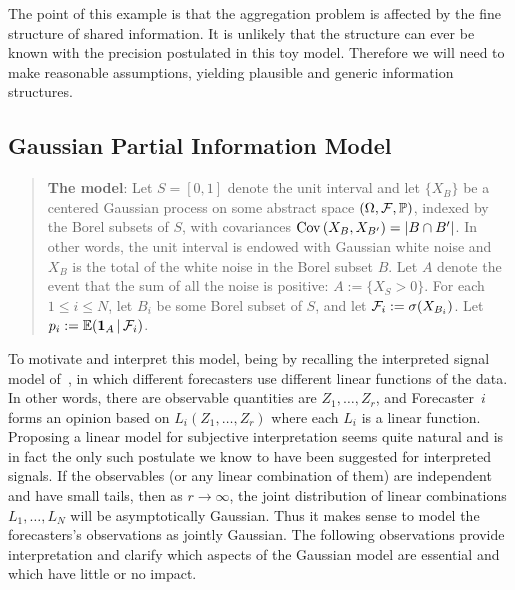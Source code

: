 \documentclass[11pt]{article}
\renewcommand{\P}{\mathbb{P}}
\newcommand{\E}{\mathbb{E}}
\theoremstyle{definition}
\theoremstyle{definition}
\def\one{{\bf 1}}
\def\F{{\cal F}}
\def\P{{\mathbb P}}
\def\E{{\mathbb E}}
\def\Cov{{\rm Cov}\,}
\def\|{\, | \,}
\begin{document}
The point of this example is that the aggregation problem is 
affected by the fine structure of shared information.  It is
unlikely that the structure can ever be known with the precision
postulated in this toy model.  Therefore we will need to make
reasonable assumptions, yielding plausible and generic information
structures.

\subsection{Gaussian Partial Information Model}
\label{ss:Gaussian}

\begin{quote}
{\bf The model}: Let $S = [0,1]$ denote 
the unit interval and let $\{ X_B \}$ be a centered Gaussian process 
on some abstract space $(\Omega , \F , \P)$, indexed by the 
Borel subsets of $S$, with covariances $\Cov (X_B , X_{B'}) 
= |B \cap B'|$.  In other words, the unit interval is endowed
with Gaussian white noise and $X_B$ is the total of the white
noise in the Borel subset $B$.  Let $A$ denote the event that
the sum of all the noise is positive: $A := \{ X_S > 0 \}$.
For each $1 \leq i \leq N$, let $B_i$ be some Borel subset of $S$,
and let $\F_i := \sigma (X_{B_i})$.  Let $p_i := \E (\one_A \| \F_i)$.
\end{quote}

To motivate and interpret this model, being by recalling the 
interpreted signal model of~\citet{broomell2009experts}, in which 
different forecasters use different linear functions of the data.  
In other words, there are observable quantities are $Z_1 , \ldots , Z_r$, 
and Forecaster~$i$ forms an opinion based on $L_i (Z_1 , \ldots , Z_r)$ 
where each $L_i$ is a linear function.  Proposing a linear model
for subjective interpretation seems quite natural and is in fact
the only such postulate we know to have been suggested for 
interpreted signals.
If the observables (or any linear combination of them)
are independent and have small tails, then as $r \to \infty$, the
joint distribution of linear combinations $L_1 , \ldots , L_N$
will be asymptotically Gaussian.  Thus it makes sense to model
the forecasters's observations as jointly Gaussian.  The following
observations provide interpretation and clarify which aspects of the
Gaussian model are essential and which have little or no impact.
\end{document}
